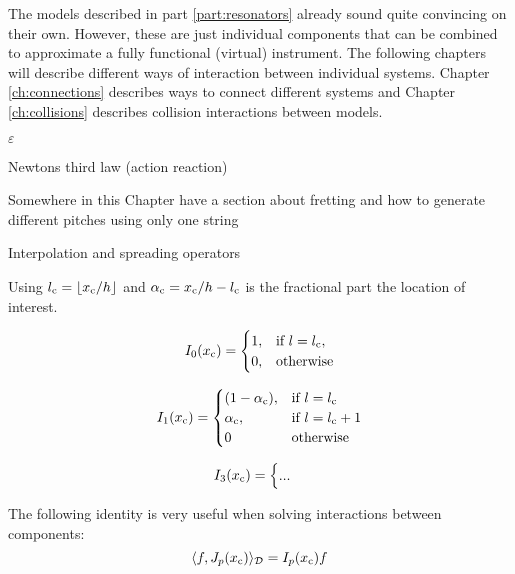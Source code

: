 The models described in part \ref{part:resonators} already sound quite convincing on their own. However, these are just individual components that can be combined to approximate a fully functional (virtual) instrument. The following chapters will describe different ways of interaction between individual systems. Chapter \ref{ch:connections} describes ways to connect different systems and Chapter \ref{ch:collisions} describes collision interactions between models. 

$\varepsilon$

Newtons third law (action reaction)

Somewhere in this Chapter have a section about fretting and how to generate different pitches using only one string

Interpolation and spreading operators

Using $l_\ctxt = \floor[x_\ctxt / h]$ and $\alpha_{\text{c}} = x_{\text{c}} / h - l_{\text{c}}$ is the fractional part the location of interest.
 
\begin{equation}
    I_0(x_{\text{c}}) = \begin{cases}
        1, & \text{if}\ l = l_{\text{c}},\\
        0, & \text{otherwise}
    \end{cases}
\end{equation}

\begin{equation}
    I_1(x_{\text{c}}) = \begin{cases}
        (1-\alpha_{\text{c}}), & \text{if}\ l = l_{\text{c}}\\
        \alpha_{\text{c}} , & \text{if}\ l = l_{\text{c}} + 1\\
        0 & \text{otherwise}
    \end{cases}
\end{equation}

\begin{equation}
    I_3(x_{\text{c}}) = \begin{cases}
        ...
    \end{cases}
\end{equation}

The following identity is very useful when solving interactions between components:
\begin{equation}\label{eq:identityIJ}
    \langle f, J_p(x_{\text{c}}) \rangle_{\mathcal{D}} = I_p(x_{\text{c}}) f
\end{equation}